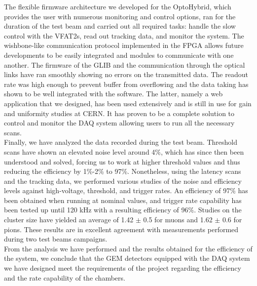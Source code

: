     The flexible firmware architecture we developed for the OptoHybrid, which provides the user with numerous monitoring and control options, ran for the duration of the test beam and carried out all required tasks: handle the slow control with the VFAT2s, read out tracking data, and monitor the system. The wishbone-like communication protocol implemented in the FPGA allows future developments to be easily integrated and modules to communicate with one another. The firmware of the GLIB and the communication through the optical links have ran smoothly showing no errors on the transmitted data. The readout rate was high enough to prevent buffer from overflowing and the data taking has shown to be well integrated with the software. The latter, namely a web application that we designed, has been used extensively and is still in use for gain and uniformity studies at CERN. It has proven to be a complete solution to control and monitor the DAQ system allowing users to run all the necessary scans. \\

    Finally, we have analyzed the data recorded during the test beam. Threshold scans have shown an elevated noise level around 4\%, which has since then been understood and solved, forcing us to work at higher threshold values and thus reducing the efficiency by 1\%-2\% to 97\%. Nonetheless, using the latency scans and the tracking data, we performed various studies of the noise and efficiency levels against high-voltage, threshold, and trigger rates. An efficiency of 97\% has been obtained when running at nominal values, and trigger rate capability has been tested up until 120 kHz with a resulting efficiency of 96\%. Studies on the cluster size have yielded an average of 1.42 $\pm$ 0.5 for muons and 1.62 $\pm$ 0.6 for pions. These results are in excellent agreement with measurements performed during two test beams campaigns. \\

    From the analysis we have performed and the results obtained for the efficiency of the system, we conclude that the GEM detectors equipped with the DAQ system we have designed meet the requirements of the project regarding the efficiency and the rate capability of the chambers.
